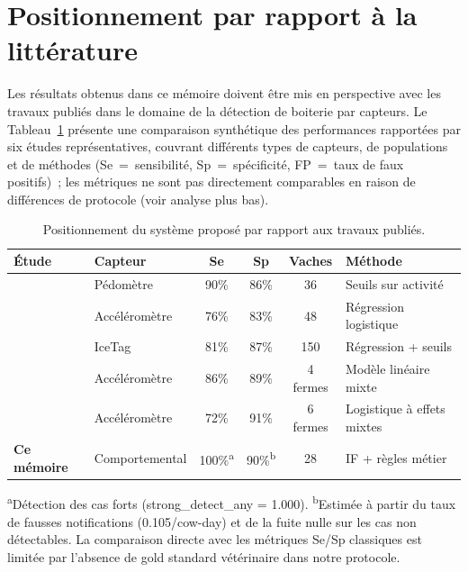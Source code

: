 \FloatBarrier
\section{Positionnement par rapport à la littérature}

Les résultats obtenus dans ce mémoire doivent être mis en perspective avec les travaux publiés
dans le domaine de la détection de boiterie par capteurs. Le
Tableau~\ref{tab:comparaison_litterature_ch4} présente une comparaison synthétique des
performances rapportées par six études représentatives, couvrant différents types de capteurs,
de populations et de méthodes (Se~=~sensibilité, Sp~=~spécificité, FP~=~taux de faux
positifs)~; les métriques ne sont pas directement comparables en raison de différences de
protocole (voir analyse plus bas).

\begin{table}[H]
    \centering
    \caption{Positionnement du système proposé par rapport aux travaux publiés.}
    \label{tab:comparaison_litterature_ch4}
    \footnotesize
    \begin{tabular}{>{\raggedright\arraybackslash}p{2.2cm}
                    >{\raggedright\arraybackslash}p{2.3cm}
                    cccp{2.6cm}}
        \toprule
        \textbf{Étude} & \textbf{Capteur} & \textbf{Se} & \textbf{Sp}
        & \textbf{Vaches} & \textbf{Méthode} \\
        \midrule
        \cite{alsaaod2012electronic}
        & Pédomètre & 90\% & 86\% & 36 & Seuils sur activité \\
        \addlinespace
        \cite{chapinal2010measurement}
        & Accéléromètre & 76\% & 83\% & 48 & Régression logistique \\
        \addlinespace
        \cite{beer2016objective}
        & IceTag & 81\% & 87\% & 150 & Régression + seuils \\
        \addlinespace
        \cite{thorup2015lameness}
        & Accéléromètre & 86\% & 89\% & 4 fermes & Modèle linéaire mixte \\
        \addlinespace
        \cite{lavrova2023lameness}
        & Accéléromètre & 72\% & 91\% & 6 fermes & Logistique à effets mixtes \\
        \addlinespace
        \textbf{Ce mémoire}
        & Comportemental & 100\%\textsuperscript{a} & 90\%\textsuperscript{b} & 28
        & IF + règles métier \\
        \bottomrule
    \end{tabular}

    \vspace{4pt}
    {\footnotesize \textsuperscript{a}Détection des cas forts (strong\_detect\_any = 1.000).
    \textsuperscript{b}Estimée à partir du taux de fausses notifications (0.105/cow-day) et
    de la fuite nulle sur les cas non détectables. La comparaison directe avec les métriques
    Se/Sp classiques est limitée par l'absence de gold standard vétérinaire dans notre protocole.}
\end{table}

